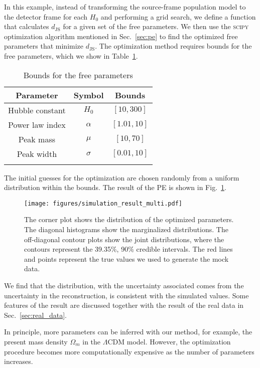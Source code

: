 \documentclass[sn-aps, pdflatex]{sn-jnl}
\begin{document}
In this example, instead of transforming the source-frame population model to the detector frame for each $H_0$ and performing a grid search, we define a function that calculates $d_\mathrm{JS}$ for a given set of the free parameters.
We then use the \textsc{scipy} optimization algorithm mentioned in Sec.~\ref{sec:pe} to find the optimized free parameters that minimize $d_\mathrm{JS}$.
The optimization method requires bounds for the free parameters, which we show in Table~\ref{tab:bounds}.
\begin{table}[htbp]
    \caption{Bounds for the free parameters}
    \begin{tabular}{ccc}
        \toprule
        Parameter & Symbol & Bounds \\
        \midrule
        Hubble constant & $H_0$ & $[10, 300]$ \\
        Power law index & $\alpha$ & $[1.01, 10]$ \\
        Peak mass & $\mu$ & $[10, 70]$ \\
        Peak width & $\sigma$ & $[0.01, 10]$ \\
        \botrule
    \end{tabular}
    \label{tab:bounds}
\end{table}
The initial guesses for the optimization are chosen randomly from a uniform distribution within the bounds.
The result of the \ac{PE} is shown in Fig.~\ref{fig:simulation_result_multi}.
\begin{figure}[htbp]
    \texttt{[image: figures/simulation\_result\_multi.pdf]}
    \caption{
        The corner plot shows the distribution of the optimized parameters.
        The diagonal histograms show the marginalized distributions.
        The off-diagonal contour plots show the joint distributions, where the contours represent the 39.35\%, 90\% credible intervals.
        The red lines and points represent the true values we used to generate the mock data.
    }
    \label{fig:simulation_result_multi}
\end{figure}
We find that the distribution, with the uncertainty associated comes from the uncertainty in the reconstruction, is consistent with the simulated values.
Some features of the result are discussed together with the result of the real data in Sec.~\ref{sec:real_data}.

In principle, more parameters can be inferred with our method, for example, the present mass density $\Omega_m$ in the $\Lambda$CDM model.
However, the optimization procedure becomes more computationally expensive as the number of parameters increases.
\end{document}
